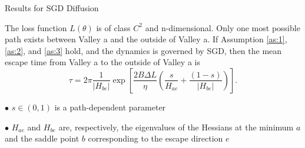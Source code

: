 \documentclass{beamer}
\begin{document}
\begin{frame}{Results for SGD Diffusion}
    \begin{theorem}
 \label{pr:SGD}
 The loss function $L(\theta)$ is of class $C^{2}$ and n-dimensional.  Only one most possible path exists between Valley a and the outside of Valley a. If Assumption \ref{as:1}, \ref{as:2}, and \ref{as:3} hold, and the dynamics is governed by SGD, then the mean escape time from Valley a to the outside of Valley a is
 \[ \tau = 2\pi  \frac{1}{|H_{be}|} \exp\left[ \frac{2 B \Delta L}{\eta } \left(\frac{s }{H_{ae}} + \frac{(1-s)}{|H_{be}|}\right)\right]   . \]
 \end{theorem}

$\bullet$ $s \in (0,1)$ is a path-dependent parameter

$\bullet$ $H_{ae}$ and $H_{be}$ are, respectively, the eigenvalues of the Hessians at the minimum $a$ and the saddle point $b$ corresponding to the escape direction $e$
\end{frame}
\end{document}
